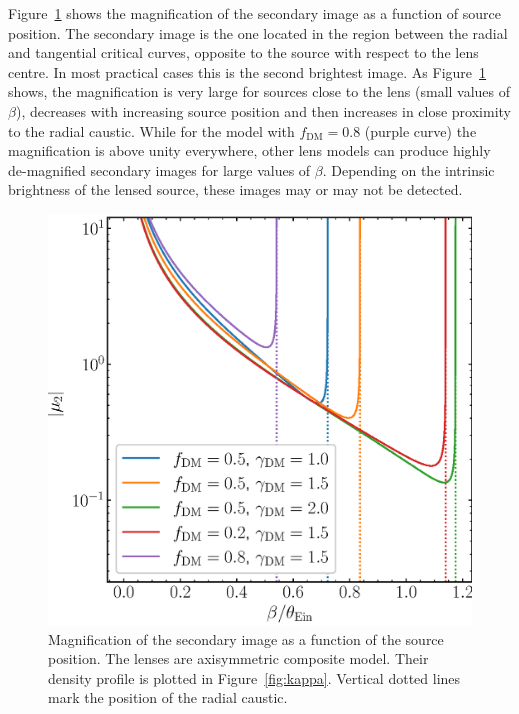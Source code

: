 \documentclass{aa}
\def\tein{\theta_{\mathrm{Ein}}}
\def\crosssect{\sigma_\mathrm{{SL}}}
\def\Fref#1{Figure~\ref{#1}\xspace}
\begin{document}
\Fref{fig:1dmag} shows the magnification of the secondary image as a function of source position. The secondary image is the one located in the region between the radial and tangential critical curves, opposite to the source with respect to the lens centre. In most practical cases this is the second brightest image.
As \Fref{fig:1dmag} shows, the magnification is very large for sources close to the lens (small values of $\beta$), decreases with increasing source position and then increases in close proximity to the radial caustic.
While for the model with $f_{\mathrm{DM}}=0.8$ (purple curve) the magnification is above unity everywhere, other lens models can produce highly de-magnified secondary images for large values of $\beta$.
Depending on the intrinsic brightness of the lensed source, these images may or may not be detected.

%
\begin{figure}
\includegraphics[width=\columnwidth]{composite_fixedap_mu2.eps}
\caption{
Magnification of the secondary image as a function of the source position.
The lenses are axisymmetric composite model. Their density profile is plotted in \Fref{fig:kappa}.
Vertical dotted lines mark the position of the radial caustic.
\label{fig:1dmag}
}
\end{figure}
\end{document}
